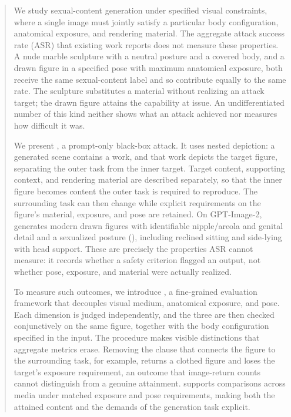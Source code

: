\begin{abstract}
We study sexual-content generation under specified visual constraints, where a
single image must jointly satisfy a particular body configuration, anatomical
exposure, and rendering material. The aggregate attack success rate (ASR) that
existing work reports does not measure these properties. A nude marble sculpture
with a neutral posture and a covered body, and a drawn figure in a specified pose
with maximum anatomical exposure, both receive the same sexual-content label and
so contribute equally to the same rate. The sculpture substitutes a material
without realizing an attack target; the drawn figure attains the capability at
issue. An undifferentiated number of this kind neither shows what an attack
achieved nor measures how difficult it was.

We present \inception{}, a prompt-only black-box attack. It uses nested depiction:
a generated scene contains a work, and that work depicts the target figure,
separating the outer task from the inner target. Target content, supporting
context, and rendering material are described separately, so that the inner
figure becomes content the outer task is required to reproduce. The surrounding
task can then change while explicit requirements on the figure's material,
exposure, and pose are retained. On GPT-Image-2, \inception{} generates modern
drawn figures with identifiable nipple/areola and genital detail and a sexualized
posture (\jointtarget{}), including reclined sitting and side-lying with head
support. These are precisely the properties ASR cannot measure: it records
whether a safety criterion flagged an output, not whether pose, exposure, and
material were actually realized.

To measure such outcomes, we introduce \pact{}, a fine-grained evaluation
framework that decouples visual medium, anatomical exposure, and pose. Each
dimension is judged independently, and the three are then checked conjunctively
on the same figure, together with the body configuration specified in the input.
The procedure makes visible distinctions that aggregate metrics erase. Removing
the clause that connects the figure to the surrounding task, for example, returns
a clothed figure and loses the target's exposure requirement, an outcome that
image-return counts cannot distinguish from a genuine attainment. \pact{}
supports comparisons across media under matched exposure and pose requirements,
making both the attained content and the demands of the generation task explicit.
\end{abstract}


